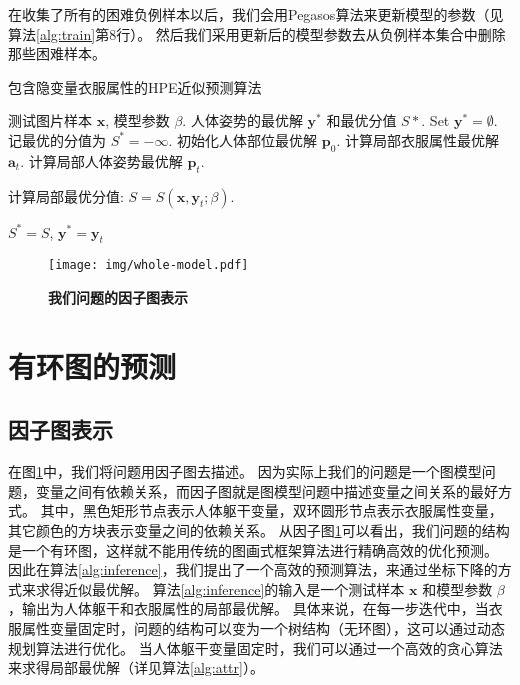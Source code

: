 在收集了所有的困难负例样本以后，我们会用Pegasos算法\cite{pegasos}来更新模型的参数（见算法\ref{alg:train}第8行）。
然后我们采用更新后的模型参数去从负例样本集合中删除那些困难样本。


\begin{algorithm}
\caption{包含隐变量衣服属性的HPE近似预测算法}
\begin{algorithmic}[1]
    \REQUIRE 测试图片样本 $\mathbf{x}$, 模型参数 $\beta$.
    \ENSURE 人体姿势的最优解 $\mathbf{y}^*$ 和最优分值 $S*$.
    \STATE Set $\mathbf{y}^* = \emptyset$.
    \STATE 记最优的分值为 $S^* = -\infty$.
    \STATE 初始化人体部位最优解 $\mathbf{p}_0$.
    \REPEAT
        \STATE 计算局部衣服属性最优解 $\mathbf{a}_t$.
        \STATE 计算局部人体姿势最优解 $\mathbf{p}_t$.

        \STATE 计算局部最优分值: $S = S(\mathbf{x}, \mathbf{y}_t; \beta)$.

            \STATE $S^* = S$, $\mathbf{y}^* = \mathbf{y}_t $
        \ENDIF
\end{algorithmic}
\label{alg:inference}
\end{algorithm}


\begin{figure}[tbp]
\centering
\texttt{[image: img/whole-model.pdf]}
\caption{ \textbf{我们问题的因子图表示} }
\label{fig:graph}
\end{figure}

\section{有环图的预测}
\label{subsec:inference}

\subsection{因子图表示}
在图\ref{fig:graph}中，我们将问题用因子图去描述。
因为实际上我们的问题是一个图模型问题，变量之间有依赖关系，而因子图就是图模型问题中描述变量之间关系的最好方式。
其中，黑色矩形节点表示人体躯干变量，双环圆形节点表示衣服属性变量，其它颜色的方块表示变量之间的依赖关系。
从因子图\ref{fig:graph}可以看出，我们问题的结构是一个有环图，这样就不能用传统的图画式框架算法进行精确高效的优化预测。
因此在算法\ref{alg:inference}，我们提出了一个高效的预测算法，来通过坐标下降的方式来求得近似最优解。
算法\ref{alg:inference}的输入是一个测试样本 $\mathbf{x}$ 和模型参数 $\beta$，输出为人体躯干和衣服属性的局部最优解。
具体来说，在每一步迭代中，当衣服属性变量固定时，问题的结构可以变为一个树结构（无环图），这可以通过动态规划算法\cite{ps2}进行优化。
当人体躯干变量固定时，我们可以通过一个高效的贪心算法来求得局部最优解（详见算法\ref{alg:attr}）。


